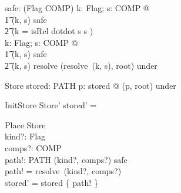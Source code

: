 \documentclass{article}
\begin{document}
\begin{axdef}
  safe: \power (Flag \cross \seq COMP)
\where
  \forall k: Flag; s: \seq COMP @ \\
  \t1 (k, s) \in safe \iff \\
  \t2 (k = isRel \land dotdot \notin \ran s \land s \neq \langle \rangle) \\
  \forall k: Flag; s: \seq COMP @ \\
  \t1 (k, s) \in safe \implies \\
  \t2 (k, s) \in \dom resolve \land (resolve~(k, s), root) \in under
\end{axdef}

\begin{schema}{Store}
  stored: \power PATH
\where
  \forall p: stored @ (p, root) \in under
\end{schema}

\begin{schema}{InitStore}
  Store'
\where
  stored' = \emptyset
\end{schema}

\begin{schema}{Place}
  \Delta Store \\
  kind?: Flag \\
  comps?: \seq COMP \\
  path!: PATH
\where
  (kind?, comps?) \in safe \\
  path! = resolve~(kind?, comps?) \\
  stored' = stored \cup \{ path! \}
\end{schema}
\end{document}
